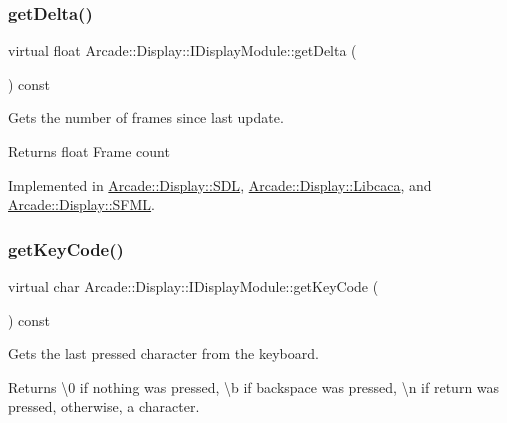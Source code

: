 \subsubsection{\texorpdfstring{getDelta()}{getDelta()}}
{\footnotesize\ttfamily virtual float Arcade\+::\+Display\+::\+I\+Display\+Module\+::get\+Delta (\begin{DoxyParamCaption}{ }\end{DoxyParamCaption}) const\hspace{0.3cm}{\ttfamily [pure virtual]}}



Gets the number of frames since last update. 

\begin{DoxyReturn}{Returns}
float Frame count 
\end{DoxyReturn}


Implemented in \mbox{\hyperlink{classArcade_1_1Display_1_1SDL_a1ca09d130dea3bec2481eb72a49c0f03}{Arcade\+::\+Display\+::\+S\+DL}}, \mbox{\hyperlink{classArcade_1_1Display_1_1Libcaca_a6aee007c10e66709680d1ec80f2662a4}{Arcade\+::\+Display\+::\+Libcaca}}, and \mbox{\hyperlink{classArcade_1_1Display_1_1SFML_ae1466db8c13b08e99ebe5ffab68884c7}{Arcade\+::\+Display\+::\+S\+F\+ML}}.

\mbox{\label{classArcade_1_1Display_1_1IDisplayModule_a403f8a0f065dad707a881ef3cee79805}} 
\subsubsection{\texorpdfstring{getKeyCode()}{getKeyCode()}}
{\footnotesize\ttfamily virtual char Arcade\+::\+Display\+::\+I\+Display\+Module\+::get\+Key\+Code (\begin{DoxyParamCaption}{ }\end{DoxyParamCaption}) const\hspace{0.3cm}{\ttfamily [pure virtual]}}



Gets the last pressed character from the keyboard. 

\begin{DoxyReturn}{Returns}
\textbackslash{}0 if nothing was pressed, \textbackslash{}b if backspace was pressed, \textbackslash{}n if return was pressed, otherwise, a character. 
\end{DoxyReturn}


